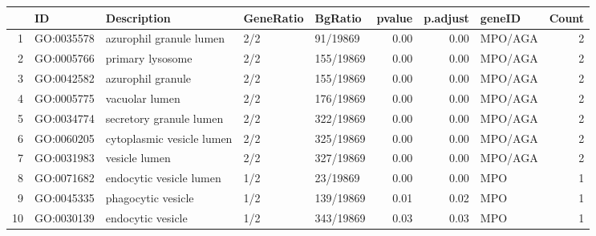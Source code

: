 \begin{table}[ht]
\centering
\begin{tabular}{rllllrrlr}
  \hline
 & ID & Description & GeneRatio & BgRatio & pvalue & p.adjust & geneID & Count \\ 
  \hline
1 & GO:0035578 & azurophil granule lumen & 2/2 & 91/19869 & 0.00 & 0.00 & MPO/AGA &   2 \\ 
  2 & GO:0005766 & primary lysosome & 2/2 & 155/19869 & 0.00 & 0.00 & MPO/AGA &   2 \\ 
  3 & GO:0042582 & azurophil granule & 2/2 & 155/19869 & 0.00 & 0.00 & MPO/AGA &   2 \\ 
  4 & GO:0005775 & vacuolar lumen & 2/2 & 176/19869 & 0.00 & 0.00 & MPO/AGA &   2 \\ 
  5 & GO:0034774 & secretory granule lumen & 2/2 & 322/19869 & 0.00 & 0.00 & MPO/AGA &   2 \\ 
  6 & GO:0060205 & cytoplasmic vesicle lumen & 2/2 & 325/19869 & 0.00 & 0.00 & MPO/AGA &   2 \\ 
  7 & GO:0031983 & vesicle lumen & 2/2 & 327/19869 & 0.00 & 0.00 & MPO/AGA &   2 \\ 
  8 & GO:0071682 & endocytic vesicle lumen & 1/2 & 23/19869 & 0.00 & 0.00 & MPO &   1 \\ 
  9 & GO:0045335 & phagocytic vesicle & 1/2 & 139/19869 & 0.01 & 0.02 & MPO &   1 \\ 
  10 & GO:0030139 & endocytic vesicle & 1/2 & 343/19869 & 0.03 & 0.03 & MPO &   1 \\ 
   \hline
\end{tabular}
\end{table}
